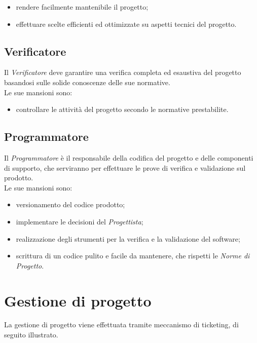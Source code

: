 \documentclass[../NormediProgetto.tex]{subfiles}
\begin{document}
	\begin{itemize}
		\item rendere facilmente mantenibile il progetto;
		\item effettuare scelte efficienti ed ottimizzate su aspetti tecnici del progetto.
	\end{itemize}
	
	\subsection {Verificatore}
	
	Il \textit{Verificatore} deve garantire una verifica completa ed esaustiva del progetto basandosi sulle solide conoscenze delle sue normative.
	\\ \noindent Le sue mansioni sono:
	\begin{itemize}
		\item controllare le attività del progetto secondo le normative prestabilite.
	\end{itemize}
	
	\subsection {Programmatore}
	
	Il \textit{Programmatore} è il responsabile della codifica del progetto e delle componenti di supporto, che serviranno per effettuare le prove di verifica e validazione sul prodotto.
	\\ \noindent Le sue mansioni sono:
	
	\begin{itemize}
		\item versionamento del codice prodotto;
		\item implementare le decisioni del \textit{Progettista};
		\item realizzazione degli strumenti per la verifica e la validazione del software;
		\item scrittura di un codice pulito e facile da mantenere, che rispetti le \textit{Norme di Progetto}.
	\end{itemize}
	
	\section{Gestione di progetto}
	
	La gestione di progetto viene effettuata tramite meccanismo di ticketing, di seguito illustrato.
	
\end{document}

